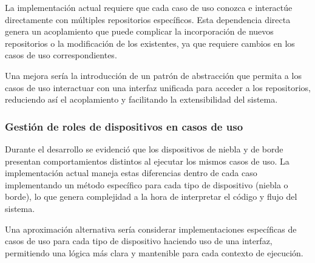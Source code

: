La implementación actual requiere que cada caso de uso conozca e interactúe directamente con múltiples repositorios específicos. Esta dependencia directa genera un acoplamiento que puede complicar la incorporación de nuevos repositorios o la modificación de los existentes, ya que requiere cambios en los casos de uso correspondientes.

Una mejora sería la introducción de un patrón de abstracción que permita a los casos de uso interactuar con una interfaz unificada para acceder a los repositorios, reduciendo así el acoplamiento y facilitando la extensibilidad del sistema.

\subsubsection{Gestión de roles de dispositivos en casos de uso}

Durante el desarrollo se evidenció que los dispositivos de niebla y de borde presentan comportamientos distintos al ejecutar los mismos casos de uso. La implementación actual maneja estas diferencias dentro de cada caso implementando un método específico para cada tipo de dispositivo (niebla o borde), lo que genera complejidad a la hora de interpretar el código y flujo del sistema.

Una aproximación alternativa sería considerar implementaciones específicas de casos de uso para cada tipo de dispositivo haciendo uso de una interfaz, permitiendo una lógica más clara y mantenible para cada contexto de ejecución.
